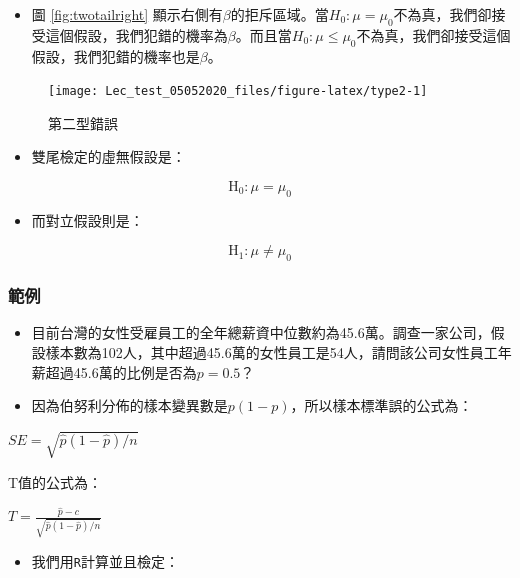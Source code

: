 \documentclass[hyperref,]{ctexart}
\providecommand{\tightlist}{%
  \setlength{\itemsep}{0pt}\setlength{\parskip}{0pt}}
\begin{document}
\begin{itemize}
\tightlist
\item
  圖 \ref{fig:twotailright}
  顯示右側有\(\beta\)的拒斥區域。當\(H_{\text{0}}: \mu=\mu_{0}\)不為真，我們卻接受這個假設，我們犯錯的機率為\(\beta\)。而且當\(H_{\text{0}}: \mu\leq \mu_{0}\)不為真，我們卻接受這個假設，我們犯錯的機率也是\(\beta\)。
\end{itemize}

\begin{figure}

\texttt{[image: Lec\_test\_05052020\_files/figure-latex/type2-1]} \hfill{}

\caption{\label{fig:twotailright}第二型錯誤}\label{fig:type2}
\end{figure}

\begin{itemize}
\tightlist
\item
  雙尾檢定的虛無假設是：
\end{itemize}

\[\text{H}_{\text{0}}: \mu = \mu_{0}\]

\begin{itemize}
\tightlist
\item
  而對立假設則是：
\end{itemize}

\[\text{H}_{\text{1}}: \mu \neq \mu_{0}\]

\hypertarget{ux7bc4ux4f8b}{%
\subsubsection{範例}\label{ux7bc4ux4f8b}}

\begin{itemize}
\item
  目前台灣的女性受雇員工的全年總薪資中位數約為45.6萬。調查一家公司，假設樣本數為102人，其中超過45.6萬的女性員工是54人，請問該公司女性員工年薪超過45.6萬的比例是否為\(p=0.5\)？
\item
  因為伯努利分佈的樣本變異數是\(p(1-p)\)，所以樣本標準誤的公式為：
\end{itemize}

\(SE=\sqrt{\hat{p}(1-\hat{p})/n}\)

T值的公式為：

\(T=\frac{\hat{p}-c}{\sqrt{\hat{p}(1-\hat{p})/n}}\)

\begin{itemize}
\tightlist
\item
  我們用\texttt{R}計算並且檢定：
\end{itemize}
\end{document}
